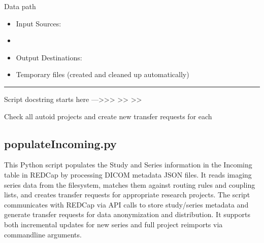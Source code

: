 \documentclass[letterpaper,10pt,english]{sphinxmanual}
\begin{document}
\sphinxAtStartPar
{}


\sphinxAtStartPar
{}


\sphinxAtStartPar
Data path
\begin{itemize}
\item {} 
\sphinxAtStartPar
Input Sources:

\end{itemize}
\begin{itemize}
\item {} 
\sphinxAtStartPar
{}

\end{itemize}
\begin{itemize}
\item {} 
\sphinxAtStartPar
Output Destinations:

\end{itemize}
\begin{itemize}
\item {} 
\sphinxAtStartPar
Temporary files (created and cleaned up automatically)

\end{itemize}


\bigskip\hrule\bigskip


\sphinxAtStartPar
Script docstring starts here —\textgreater{}\textgreater{}\textgreater{}
\textendash{}\textgreater{}\textgreater{}
\textendash{}\textgreater{}\textgreater{}

\sphinxAtStartPar
Check all auto\sphinxhyphen{}id projects and create new transfer requests for each

\sphinxstepscope


\subsection{populateIncoming.py}
\label{\detokenize{Architecture/scripts/populateIncoming:populateincoming-py}}\label{\detokenize{Architecture/scripts/populateIncoming::doc}}
\sphinxAtStartPar
This Python script populates the Study and Series information in the Incoming table in REDCap by processing DICOM metadata JSON files. It reads imaging series data from the filesystem, matches them against routing rules and coupling lists, and creates transfer requests for appropriate research projects. The script communicates with REDCap via API calls to store study/series metadata and generate transfer requests for data anonymization and distribution. It supports both incremental updates for new series and full project reimports via command\sphinxhyphen{}line arguments.
\end{document}
